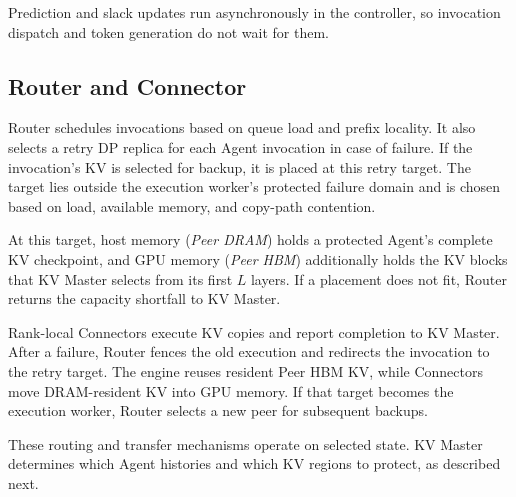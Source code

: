 Prediction and slack updates run asynchronously in the controller, so
invocation dispatch and token generation do not wait for them.

\subsection{Router and Connector}
\label{sec:router}

Router schedules invocations based on queue load and prefix locality.
It also selects a retry DP replica for each Agent invocation in case of
failure. If the invocation's KV is selected for backup, it is placed at
this retry target. The target lies outside the execution worker's
protected failure domain and is chosen based on load, available memory,
and copy-path contention.

At this target, host memory (\emph{Peer DRAM}) holds a protected Agent's
complete KV checkpoint, and GPU memory (\emph{Peer HBM}) additionally
holds the KV blocks that KV Master selects from its first $L$ layers.
If a placement does not fit, Router returns the capacity shortfall to
KV Master.

Rank-local Connectors execute KV copies and report completion to KV
Master. After a failure, Router fences the old execution and redirects
the invocation to the retry target. The engine reuses resident Peer HBM
KV, while Connectors move DRAM-resident KV into GPU memory.
If that target becomes the execution worker, Router selects a new peer
for subsequent backups.

These routing and transfer mechanisms operate on selected state.
KV Master determines which Agent histories and which KV regions to
protect, as described next.

